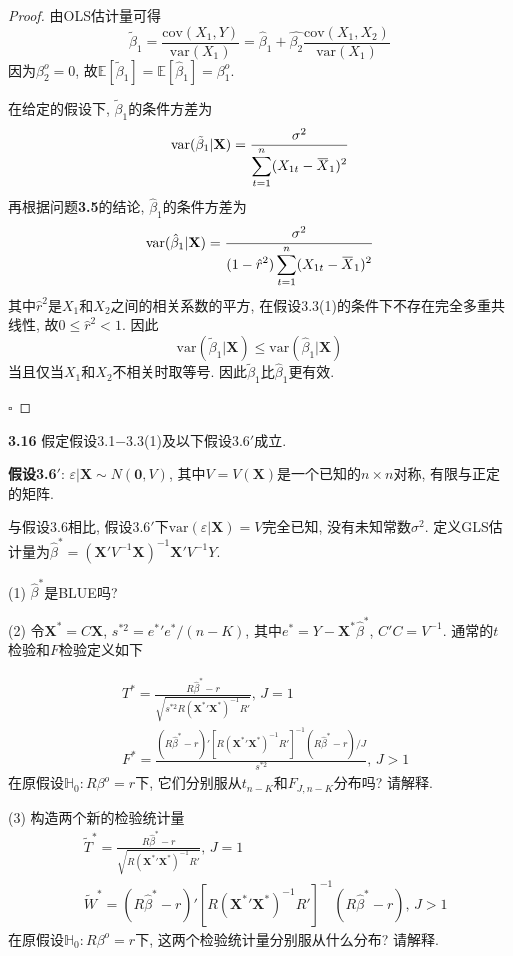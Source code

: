 \documentclass[cn,12pt,math=mtpro2,citestyle=gb7714-2015,bibstyle=gb7714-2015,twocol,mode=simple]{elegantbook}
\newcommand{\overbar}[1]{\mkern 1.5mu\overline{\mkern-1.5mu#1\mkern-1.5mu}\mkern 1.5mu}
\newcommand{\E}{\mathbb{E}}
\newcommand{\var}{\text{var}}
\newcommand{\hbeta}{\hat{\beta}}
\newcommand{\tbeta}{\tilde{\beta}}
\begin{document}
\begin{proof}
 由OLS估计量可得
$$ \tbeta_1=\frac{\text{cov}(X_1,Y)}{\var(X_1)}=\hbeta_1+\hat{\beta_2}\frac{\text{cov}(X_1,X_2)}{\var(X_1)}$$
因为$\beta_2^o=0$, 故$\E[\tbeta_1]=\E[\hbeta_1]=\beta_1^o$.

在给定的假设下, $\tbeta_1$的条件方差为
$$\var(\tbeta_1|\mathbf{X})=\frac{\sigma^2}{\displaystyle \sum_{t=1}^{n}(X_{1t}-\overbar{X}_1)^2}$$
再根据问题\textbf{3.5}的结论, $\hbeta_1$的条件方差为
$$\var(\hbeta_1|\mathbf{X})=\frac{\sigma^2}{\displaystyle (1-\hat{r}^2)\sum_{t=1}^{n}(X_{1t}-\overbar{X}_1)^2}$$
其中$\hat{r}^2$是$X_1$和$X_2$之间的相关系数的平方, 在假设3.3(1)的条件下不存在完全多重共线性, 故$0\leq \hat{r}^2<1$. 因此
$$\var(\tbeta_1|\mathbf{X})\leq \var(\hbeta_1|\mathbf{X})$$
当且仅当$X_1$和$X_2$不相关时取等号. 因此$\tbeta_1$比$\hbeta_1$更有效.

$\square$
\end{proof}

\textbf{3.16} 假定假设3.1$-$3.3(1)及以下假设3.6$'$成立.

\textbf{假设3.6$'$}: $\varepsilon|\mathbf{X}\sim N(\mathbf{0},V)$, 其中$V=V(\mathbf{X})$是一个已知的$n\times n$对称, 有限与正定的矩阵.

与假设3.6相比, 假设3.6$'$下$\var(\varepsilon|\mathbf{X})=V$完全已知, 没有未知常数$\sigma^2$. 定义GLS估计量为$\hbeta^{\ast}=(\mathbf{X}'V^{-1}\mathbf{X})^{-1}\mathbf{X}'V^{-1}Y$.

(1) $\hbeta^{\ast}$是BLUE吗?

(2) 令$\mathbf{X}^{\ast}=C\mathbf{X}$, $s^{\ast 2}=e^{\ast}{'}e^{\ast}/(n-K)$, 其中$e^{\ast}=Y-\mathbf{X}^{\ast}\hbeta^{\ast}$, $C'C=V^{-1}$. 通常的$t$检验和$F$检验定义如下

\begin{align*}
&T^{\ast}=\frac{R\hbeta^{\ast}-r}{\sqrt{s^{\ast 2}R(\mathbf{X}^{\ast}{'}\mathbf{X}^{\ast})^{-1}R'}}, \, J=1 \\
&F^{\ast}=\frac{(R\hbeta^{\ast}-r)'[R(\mathbf{X}^{\ast}{'}\mathbf{X}^{\ast})^{-1}R']^{-1}(R\hbeta^{\ast}-r)/J}{s^{\ast 2}}, \, J>1
\end{align*}
在原假设$\mathbb{H}_0:R\beta^o=r$下, 它们分别服从$t_{n-K}$和$F_{J,n-K}$分布吗? 请解释.

(3) 构造两个新的检验统计量
\begin{align*}
&\tilde{T}^{\ast}=\frac{R\hbeta^{\ast}-r}{\sqrt{R(\mathbf{X}^{\ast}{'}\mathbf{X}^{\ast})^{-1}R'}}, \, J=1 \\
&\tilde{W}^{\ast}=(R\hbeta^{\ast}-r)'[R(\mathbf{X}^{\ast}{'}\mathbf{X}^{\ast})^{-1}R']^{-1}(R\hbeta^{\ast}-r), \, J>1
\end{align*}
在原假设$\mathbb{H}_0:R\beta^o=r$下, 这两个检验统计量分别服从什么分布? 请解释.
\end{document}
